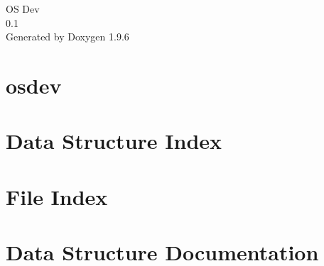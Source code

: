 \documentclass[twoside]{book}
\newcommand{\+}{\discretionary{\mbox{\scriptsize$\hookleftarrow$}}{}{}}
\newcommand{\clearemptydoublepage}{%
    \newpage{\pagestyle{empty}\cleardoublepage}%
  }
\begin{document}
  \raggedbottom
    \hypersetup{pageanchor=false,
                bookmarksnumbered=true,
                pdfencoding=unicode
               }
  \begin{titlepage}
  \vspace*{7cm}
  \begin{center}%
  {\Large OS Dev}\\
  [1ex]\large 0.\+1 \\
  \vspace*{1cm}
  {\large Generated by Doxygen 1.9.6}\\
  \end{center}
  \end{titlepage}
  \clearemptydoublepage
  \tableofcontents
  \clearemptydoublepage
  \hypersetup{pageanchor=true}
\chapter{osdev}
\label{md_README}

\chapter{Data Structure Index}

\chapter{File Index}

\chapter{Data Structure Documentation}

















\end{document}
